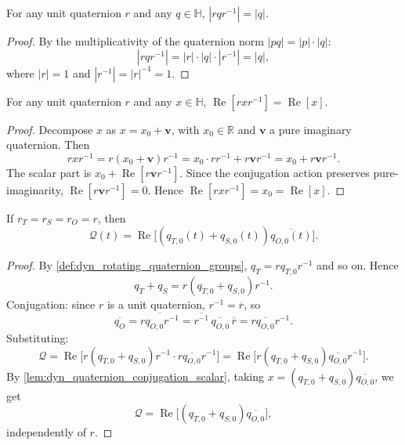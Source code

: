 \begin{proposition}\label{prop:dyn_quaternion_rotation_norm}
For any unit quaternion $r$ and any $q\in\mathbb H$, $|rqr^{-1}|=|q|$.
\end{proposition}

\begin{proof}
By the multiplicativity of the quaternion norm $|pq|=|p|\cdot|q|$:
\[
|rqr^{-1}|=|r|\cdot|q|\cdot|r^{-1}|=|q|,
\]
where $|r|=1$ and $|r^{-1}|=|r|^{-1}=1$.
\end{proof}

\begin{lemma}\label{lem:dyn_quaternion_conjugation_scalar}
For any unit quaternion $r$ and any $x\in\mathbb H$, $\operatorname{Re}[rxr^{-1}]=\operatorname{Re}[x]$.
\end{lemma}

\begin{proof}
Decompose $x$ as $x=x_0+\mathbf v$, with $x_0\in\mathbb R$ and $\mathbf v$ a pure imaginary quaternion. Then
\[
rxr^{-1}=r(x_0+\mathbf v)r^{-1}=x_0\cdot rr^{-1}+r\mathbf v r^{-1}=x_0+r\mathbf v r^{-1}.
\]
The scalar part is $x_0+\operatorname{Re}[r\mathbf v r^{-1}]$. Since the conjugation action preserves pure-imaginarity, $\operatorname{Re}[r\mathbf v r^{-1}]=0$. Hence $\operatorname{Re}[rxr^{-1}]=x_0=\operatorname{Re}[x]$.
\end{proof}

\begin{theorem}\label{thm:dyn_quaternion_sync_invariance}
If $r_T=r_S=r_O=r$, then
\[
\mathcal Q(t)=\operatorname{Re}\!\big[(q_{T,0}(t)+q_{S,0}(t))\overline{q_{O,0}(t)}\big].
\]
\end{theorem}

\begin{proof}
By \cref{def:dyn_rotating_quaternion_groups}, $q_T=rq_{T,0}r^{-1}$ and so on. Hence
\[
q_T+q_S=r(q_{T,0}+q_{S,0})r^{-1}.
\]
Conjugation: since $r$ is a unit quaternion, $r^{-1}=\overline r$, so
\[
\overline{q_O}=\overline{rq_{O,0}r^{-1}}=\overline{r^{-1}}\,\overline{q_{O,0}}\,\overline r=r\overline{q_{O,0}}r^{-1}.
\]
Substituting:
\[
\mathcal Q=\operatorname{Re}\big[r(q_{T,0}+q_{S,0})r^{-1}\cdot r\overline{q_{O,0}}r^{-1}\big]
=\operatorname{Re}\big[r(q_{T,0}+q_{S,0})\overline{q_{O,0}}r^{-1}\big].
\]
By \cref{lem:dyn_quaternion_conjugation_scalar}, taking $x=(q_{T,0}+q_{S,0})\overline{q_{O,0}}$, we get
\[
\mathcal Q=\operatorname{Re}\big[(q_{T,0}+q_{S,0})\overline{q_{O,0}}\big],
\]
independently of $r$.
\end{proof}

